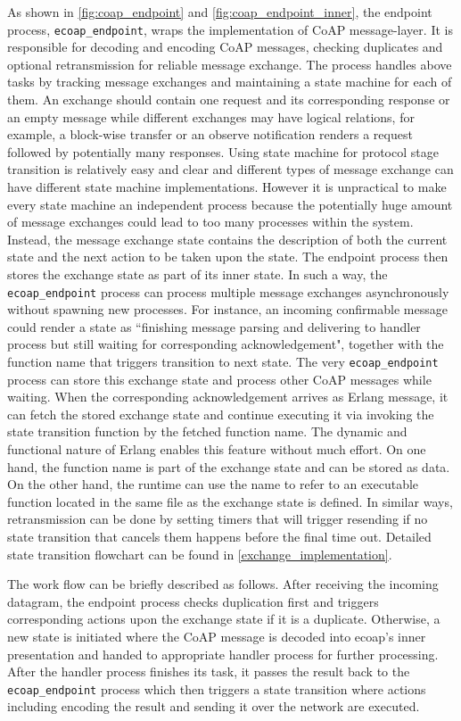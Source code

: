 As shown in \autoref{fig:coap_endpoint} and \autoref{fig:coap_endpoint_inner}, the endpoint process, \verb|ecoap_endpoint|, wraps the implementation of CoAP message-layer. It is responsible for decoding and encoding CoAP messages, checking duplicates and optional retransmission for reliable message exchange. The process handles above tasks by tracking message exchanges and maintaining a state machine for each of them. An exchange should contain one request and its corresponding response or an empty message while different exchanges may have logical relations, for example, a block-wise transfer or an observe notification renders a request followed by potentially many responses. Using state machine for protocol stage transition is relatively easy and clear and different types of message exchange can have different state machine implementations. However it is unpractical to make every state machine an independent process because the potentially huge amount of message exchanges could lead to too many processes within the system. Instead, the message exchange state contains the description of both the current state and the next action to be taken upon the state. The endpoint process then stores the exchange state as part of its inner state. In such a way, the \verb|ecoap_endpoint| process can process multiple message exchanges asynchronously without spawning new processes. For instance, an incoming confirmable message could render a state as ``finishing message parsing and delivering to handler process but still waiting for corresponding acknowledgement", together with the function name that triggers transition to next state. The very \verb|ecoap_endpoint| process can store this exchange state and process other CoAP messages while waiting. When the corresponding acknowledgement arrives as Erlang message, it can fetch the stored exchange state and continue executing it via invoking the state transition function by the fetched function name. The dynamic and functional nature of Erlang enables this feature without much effort. On one hand, the function name is part of the exchange state and can be stored as data. On the other hand, the runtime can use the name to refer to an executable function located in the same file as the exchange state is defined. In similar ways, retransmission can be done by setting timers that will trigger resending if no state transition that cancels them happens before the final time out. Detailed state transition flowchart can be found in \autoref{exchange_implementation}.

The work flow can be briefly described as follows. After receiving the incoming datagram, the endpoint process checks duplication first and triggers corresponding actions upon the exchange state if it is a duplicate. Otherwise, a new state is initiated where the CoAP message is decoded into ecoap's inner presentation and handed to appropriate handler process for further processing. After the handler process finishes its task, it passes the result back to the \verb|ecoap_endpoint| process which then  triggers a state transition where actions including encoding the result and sending it over the network are executed.

